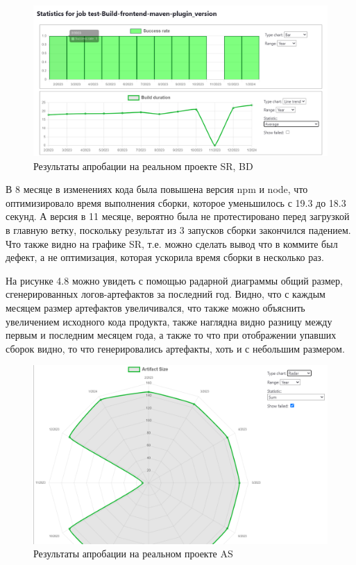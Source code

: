 \begin{figure}[ht!] 
	\center
	\includegraphics [scale=0.47] {my_folder/images//reares1}
	\caption{Результаты апробации на реальном проекте SR, BD} 
	\label{fig:reares1}  
\end{figure}

В 8 месяце в изменениях кода была повышена версия npm и node, что оптимизировало время выполнения сборки, которое уменьшилось с 19.3 до 18.3 секунд. А версия в 11 месяце, вероятно была не протестировано перед загрузкой в главную ветку, поскольку результат из 3 запусков сборки закончился падением. Что также видно на графике SR, т.е. можно сделать вывод что в коммите был дефект, а не оптимизация, которая ускорила время сборки в несколько раз.

На рисунке 4.8 можно увидеть с помощью радарной диаграммы общий размер, сгенерированных логов-артефактов за последний год. Видно, что с каждым месяцем размер артефактов увеличивался, что также можно объяснить увеличением исходного кода продукта, также наглядна видно разницу между первым и последним месяцем года, а также то что при отображении упавших сборок видно, то что генерировались артефакты, хоть и с небольшим размером.

 \begin{figure}[ht!] 
	\center
	\includegraphics [scale=0.47] {my_folder/images//realres2}
	\caption{Результаты апробации на реальном проекте AS} 
	\label{fig:realres2}  
\end{figure}


